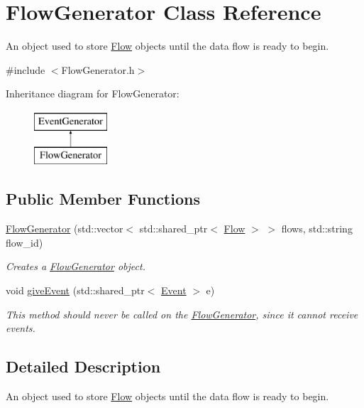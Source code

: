 \hypertarget{classFlowGenerator}{\section{\-Flow\-Generator \-Class \-Reference}
\label{classFlowGenerator}
}


\-An object used to store \hyperlink{classFlow}{\-Flow} objects until the data flow is ready to begin.  




{\ttfamily \#include $<$\-Flow\-Generator.\-h$>$}

\-Inheritance diagram for \-Flow\-Generator\-:\begin{figure}[H]
\begin{center}
\leavevmode
\includegraphics[height=2.000000cm]{classFlowGenerator}
\end{center}
\end{figure}
\subsection*{\-Public \-Member \-Functions}
\begin{DoxyCompactItemize}
\item 
\hyperlink{classFlowGenerator_ae51c2e304770a911f9cc1d8e0d01310c}{\-Flow\-Generator} (std\-::vector$<$ std\-::shared\-\_\-ptr$<$ \hyperlink{classFlow}{\-Flow} $>$ $>$ flows, std\-::string flow\-\_\-id)
\begin{DoxyCompactList}\small\item\em \-Creates a \hyperlink{classFlowGenerator}{\-Flow\-Generator} object. \end{DoxyCompactList}\item 
void \hyperlink{classFlowGenerator_a9fd8f79663c4af4ab229dde250bc258c}{give\-Event} (std\-::shared\-\_\-ptr$<$ \hyperlink{classEvent}{\-Event} $>$ e)
\begin{DoxyCompactList}\small\item\em \-This method should never be called on the \hyperlink{classFlowGenerator}{\-Flow\-Generator}, since it cannot receive events. \end{DoxyCompactList}\end{DoxyCompactItemize}


\subsection{\-Detailed \-Description}
\-An object used to store \hyperlink{classFlow}{\-Flow} objects until the data flow is ready to begin. 

